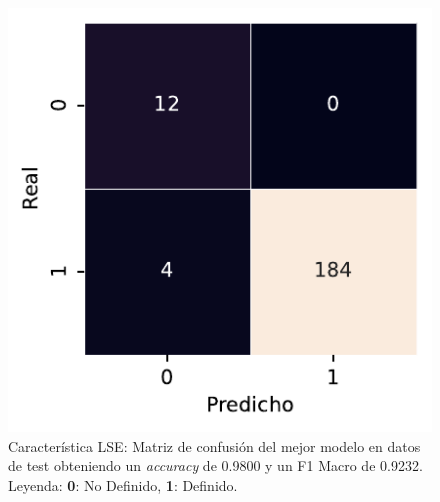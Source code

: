 \begin{figure}[htbp]
    \vspace{1.5em} %

    \includegraphics[width=0.6\linewidth]{figures/5_experiments/single-lse-cm.pdf}
    \caption[Característica LSE: Matriz de confusión del mejor modelo en datos de test.]{Característica LSE: Matriz de confusión del mejor modelo en datos de test obteniendo un \textit{accuracy} de 0.9800 y un F1 Macro de 0.9232. Leyenda: \textbf{0}: No Definido, \textbf{1}: Definido.}
    \label{fig5:LSE_confusion_matrix}
\end{figure}

